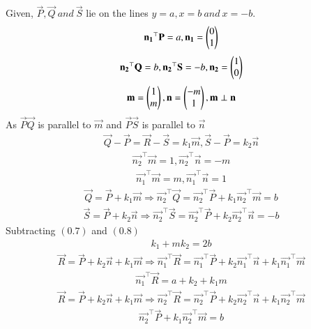 \documentclass[journal]{IEEEtran}
\begin{document}
Given,
$\vec{P}, \vec{Q} \ and \ \vec{S}$ lie on the lines $y = a, x = b \ and \ x = -b .$
\begin{align}
\mathbf{n_1}^\top\mathbf{P}=a , \mathbf{n_1}=\begin{pmatrix}0\\1\end{pmatrix}
\end{align}
\begin{align}
\mathbf{n_2}^\top\mathbf{Q}=b , \mathbf{n_2}^\top\mathbf{S}=-b , \mathbf{n_2}=\begin{pmatrix}1\\0\end{pmatrix}
\end{align}
\begin{align}
\mathbf{m}=\begin{pmatrix}1\\m\end{pmatrix} , \mathbf{n}=\begin{pmatrix}-m\\1\end{pmatrix} , \mathbf{m} \perp \mathbf{n}
\end{align}
As $\vec{P}\vec{Q}$ is parallel to $\vec{m}$ and $\vec{P}\vec{S}$ is parallel to $\vec{n}$
\begin{align}
\vec{Q}-\vec{P}=\vec{R}-\vec{S}=k_1\vec{m} , \vec{S}-\vec{P}=k_2\vec{n}
\end{align}
\begin{align}
\vec{n_2}^\top\vec{m}=1 , \vec{n_2}^\top\vec{n}=-m 
\end{align}
\begin{align}
\vec{n_1}^\top\vec{m}=m , \vec{n_1}^\top\vec{n}=1
\end{align}
\begin{align}
\vec{Q}=\vec{P}+k_1\vec{m} \Longrightarrow
\vec{n_2}^\top\vec{Q}=\vec{n_2}^\top\vec{P}+k_1\vec{n_2}^\top\vec{m}=b
\end{align}
\begin{align}
\vec{S}=\vec{P}+k_2\vec{n} \Longrightarrow 
\vec{n_2}^\top\vec{S}=\vec{n_2}^\top\vec{P}+k_2\vec{n_2}^\top\vec{n}=-b
\end{align}
Subtracting $(0.7)$ and $(0.8)$
\begin{align}
k_1+mk_2=2b
\end{align}
\begin{align}
\vec{R}=\vec{P}+k_2\vec{n}+k_1\vec{m} \Longrightarrow
\vec{n_1}^\top\vec{R}=\vec{n_1}^\top\vec{P}+k_2\vec{n_1}^\top\vec{n}+k_1\vec{n_1}^\top\vec{m}
\end{align}
\begin{align}
\vec{n_1}^\top\vec{R}=a+k_2+k_1m
\end{align}
\begin{align}
\vec{R}=\vec{P}+k_2\vec{n}+k_1\vec{m} \Longrightarrow
\vec{n_2}^\top\vec{R}=\vec{n_2}^\top\vec{P}+k_2\vec{n_2}^\top\vec{n}+k_1\vec{n_2}^\top\vec{m}
\end{align}
\begin{align}
\vec{n_2}^\top\vec{P}+k_1\vec{n_2}^\top\vec{m}=b
\end{align}
\end{document}

